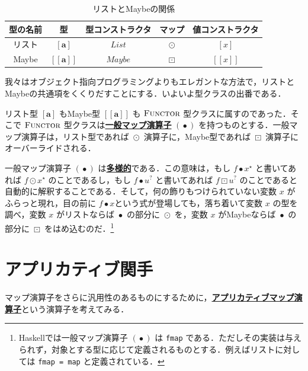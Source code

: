 \documentclass[a4paper,twocolumn]{jsbook}
\def\[{\left[\!\left[}
\def\]{\right]\!\right]}
\newcommand{\programminglanguage}[1]{\textsf{#1}}
\newcommand{\haskell}{\programminglanguage{Haskell}}
\newcommand{\keyword}[1]{{\underline{\textbf{#1}}}}
\newcommand{\code}[1]{\texttt{#1}}
\DeclareMathOperator{\mMap}{\bullet}
\DeclareMathOperator{\mMapList}{\odot}
\DeclareMathOperator{\mMapMaybe}{\boxdot}
\newcommand{\mType}[1]{\mathbf{#1}}
\newcommand{\mListWith}[1]{\left[#1\right]}
\newcommand{\mMaybeWith}[1]{\[#1\]}
\newcommand{\mListType}[1]{\mListWith{\mType{#1}}}
\newcommand{\mMaybeType}[1]{\mMaybeWith{\mType{#1}}}
\newcommand{\mTypeConstructor}[1]{\mathit{#1}} %
\DeclareMathOperator{\mListTypeConstructor}{\mTypeConstructor{List}}
\DeclareMathOperator{\mMaybeTypeConstructor}{\mTypeConstructor{Maybe}}
\newcommand{\mSpecialTypeClass}[1]{\textsc{#1}} %
\newcommand{\mFunctorTypeClass}{\mSpecialTypeClass{Functor}}
\newcommand{\mList}[1]{{#1}^\mathrm{\star}}
\newcommand{\mMaybe}[1]{{#1}^\text{?}}
\begin{document}
\begin{table}
\label{tab:list-and-maybe}
\caption{リストとMaybeの関係}
\begin{center}
\begin{tabular}{||c|c|c|c|c||}\hline
型の名前&型&型コンストラクタ&マップ&値コンストラクタ\\\hline\hline
リスト&$\mListType{a}$&$\mListTypeConstructor$&$\mMapList$&$\mListWith{x}$\\
Maybe&$\mMaybeType{a}$&$\mMaybeTypeConstructor$&$\mMapMaybe$&$\mMaybeWith{x}$\\\hline
\end{tabular}
\end{center}
\end{table}


我々はオブジェクト指向プログラミングよりもエレガントな方法で，リストとMaybeの共通項をくくりだすことにする．いよいよ型クラスの出番である．

リスト型 $\mListType{a}$ もMaybe型 $\mMaybeType{a}$ も $\mFunctorTypeClass$ 型クラスに属すのであった．そこで $\mFunctorTypeClass$ 型クラスは\keyword{一般マップ演算子} $(\mMap)$ を持つものとする．一般マップ演算子は，リスト型であれば $\mMapList$ 演算子に，Maybe型であれば $\mMapMaybe$ 演算子にオーバーライドされる．

一般マップ演算子 $(\mMap)$ は\keyword{多様的}である．この意味は，もし $f\mMap\mList{x}$ と書いてあれば $f\mMapList\mList{x}$ のことであるし，もし $f\mMap\mMaybe{u}$ と書いてあれば $f\mMapMaybe\mMaybe{u}$ のことであると自動的に解釈することである．そして，何の飾りもつけられていない変数 $x$ がふらっと現れ，目の前に $f\mMap x$という式が登場しても，落ち着いて変数 $x$ の型を調べ，変数 $x$ がリストならば $\mMap$ の部分に $\mMapList$ を，変数 $x$ がMaybeならば $\mMap$ の部分に $\mMapMaybe$ をはめ込むのだ．\footnote{\haskell では一般マップ演算子 $(\mMap)$ は \code{fmap} である．ただしその実装は与えられず，対象とする型に応じて定義されるものとする．例えばリストに対しては \code{fmap = map} と定義されている．}


\section{アプリカティブ関手}

マップ演算子をさらに汎用性のあるものにするために，\keyword{アプリカティブマップ演算子}という演算子を考えてみる．
\end{document}

